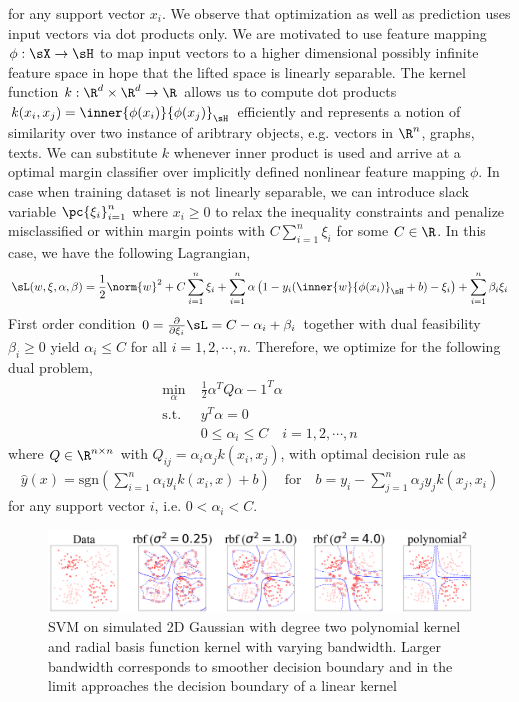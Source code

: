 \documentclass[11pt]{article}
\begin{document}
for any support vector $x_i$. We observe that optimization as well as prediction uses input vectors via dot products only. We are motivated to use feature mapping $\phi:\sX\to\sH$ to map input vectors to a higher dimensional possibly infinite feature space in hope that the lifted space is linearly separable. The kernel function $k: \R^d\times\R^d \to \R$ allows us to compute dot products $k(x_i,x_j)=\inner{\phi(x_i)}{\phi(x_j)}_{\sH}$ efficiently and represents a notion of similarity over two instance of aribtrary objects, e.g. vectors in $\R^n$, graphs, texts. We can substitute $k$ whenever inner product is used and arrive at a optimal margin classifier over implicitly defined nonlinear feature mapping $\phi$. In case when training dataset is not linearly separable, we can introduce slack variable $\pc{\xi_i}_{i=1}^n$ where $x_i\geq 0$ to relax the inequality constraints and penalize misclassified or within margin points with $C\sum_{i=1}^n \xi_i$ for some $C\in\R$. In this case, we have the following Lagrangian,
\begin{align}
    \sL(w,\xi,\alpha,\beta)
        = \frac{1}{2}\norm{w}^2 + C\sum_{i=1}^n \xi_i + \sum_{i=1}^n \alpha \left( 1-y_i ( \inner{w}{\phi(x_i)}_{\sH} + b )-\xi_i \right) + \sum_{i=1}^n \beta_i \xi_i
\end{align}
First order condition $0 = \frac{\partial}{\partial \xi_i}\sL = C - \alpha_i + \beta_i$ together with dual feasibility $\beta_i\geq 0$ yield $\alpha_i \leq C$ for all $i=1,2,\cdots,n$. Therefore, we optimize for the following dual problem,
\begin{align}
    \min_{\alpha}
        \;& \frac{1}{2} \alpha^T Q \alpha - 1^T \alpha  \\
    \text{s.t.}
    \;& y^T\alpha = 0 \\
    \;& 0\leq \alpha_i \leq C \quad i=1,2,\cdots, n
\end{align}
where $Q \in \R^{n\times n}$ with $Q_{ij} = \alpha_i \alpha_j k(x_i,x_j)$,
with optimal decision rule as
\begin{align}
    \hat{y}(x) = \text{sgn}\left(
        \sum_{i=1}^n \alpha_i y_i k(x_i,x) + b
    \right)
    \quad\text{for}\quad
    b = y_i - \sum_{j=1}^n \alpha_j y_j k(x_j,x_i)
\end{align}
for any support vector $i$, i.e. $0 < \alpha_i < C$.

\begin{center} 
\begin{figure}[h!]
    \includegraphics[width=\textwidth]{assets/svm_on_2d_gaussian_vary_kernel.png} 
    \caption{SVM on simulated 2D Gaussian with degree two polynomial kernel and radial basis function kernel with varying bandwidth. Larger bandwidth corresponds to smoother decision boundary and in the limit approaches the decision boundary of a linear kernel}
\end{figure}
\end{center} 
 
\end{document}

